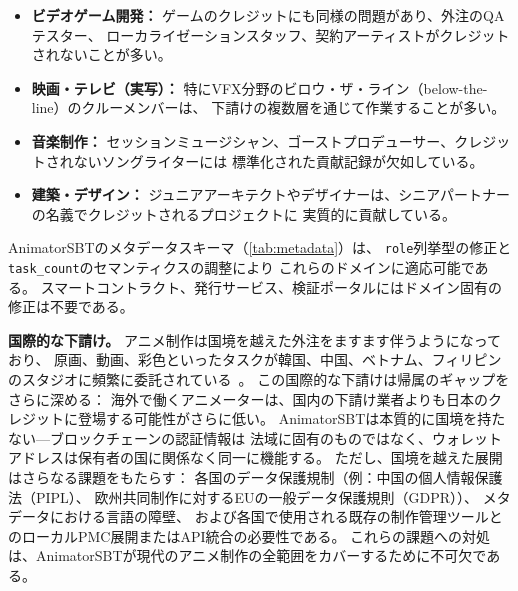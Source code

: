 \begin{itemize}
  \item \textbf{ビデオゲーム開発：}
    ゲームのクレジットにも同様の問題があり、外注のQAテスター、
    ローカライゼーションスタッフ、契約アーティストがクレジットされないことが多い。
  \item \textbf{映画・テレビ（実写）：}
    特にVFX分野のビロウ・ザ・ライン（below-the-line）のクルーメンバーは、
    下請けの複数層を通じて作業することが多い。
  \item \textbf{音楽制作：}
    セッションミュージシャン、ゴーストプロデューサー、クレジットされないソングライターには
    標準化された貢献記録が欠如している。
  \item \textbf{建築・デザイン：}
    ジュニアアーキテクトやデザイナーは、シニアパートナーの名義でクレジットされるプロジェクトに
    実質的に貢献している。
\end{itemize}

AnimatorSBTのメタデータスキーマ（\cref{tab:metadata}）は、
\texttt{role}列挙型の修正と\texttt{task\_count}のセマンティクスの調整により
これらのドメインに適応可能である。
スマートコントラクト、発行サービス、検証ポータルにはドメイン固有の修正は不要である。

\textbf{国際的な下請け。}
アニメ制作は国境を越えた外注をますます伴うようになっており、
原画、動画、彩色といったタスクが韓国、中国、ベトナム、フィリピンのスタジオに頻繁に委託されている~\cite{mori2011pitfall,tschang2010outsourcing}。
この国際的な下請けは帰属のギャップをさらに深める：
海外で働くアニメーターは、国内の下請け業者よりも日本のクレジットに登場する可能性がさらに低い。
AnimatorSBTは本質的に国境を持たない---ブロックチェーンの認証情報は
法域に固有のものではなく、ウォレットアドレスは保有者の国に関係なく同一に機能する。
ただし、国境を越えた展開はさらなる課題をもたらす：
各国のデータ保護規制（例：中国の個人情報保護法（PIPL）、
欧州共同制作に対するEUの一般データ保護規則（GDPR））、
メタデータにおける言語の障壁、
および各国で使用される既存の制作管理ツールとのローカルPMC展開またはAPI統合の必要性である。
これらの課題への対処は、AnimatorSBTが現代のアニメ制作の全範囲をカバーするために不可欠である。
